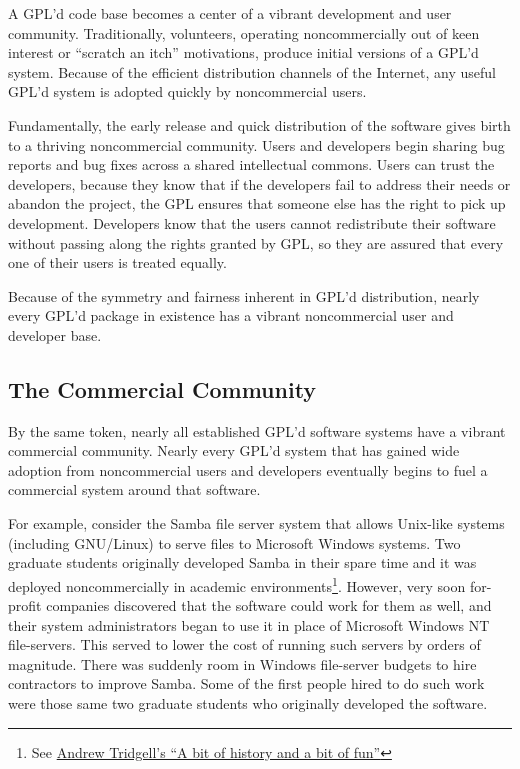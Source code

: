 A GPL'd code base becomes a center of a vibrant development and user
community.  Traditionally, volunteers, operating noncommercially out of
keen interest or ``scratch an itch'' motivations, produce initial versions
of a GPL'd system.  Because of the efficient distribution channels of the
Internet, any useful GPL'd system is adopted quickly by noncommercial
users.

Fundamentally, the early release and quick distribution of the software
gives birth to a thriving noncommercial community.  Users and developers
begin sharing bug reports and bug fixes across a shared intellectual
commons.  Users can trust the developers, because they know that if the
developers fail to address their needs or abandon the project, the GPL
ensures that someone else has the right to pick up development.
Developers know that the users cannot redistribute their software without
passing along the rights granted by GPL, so they are assured that every
one of their users is treated equally.

Because of the symmetry and fairness inherent in GPL'd distribution,
nearly every GPL'd package in existence has a vibrant noncommercial user
and developer base.

\subsection{The Commercial Community}

By the same token, nearly all established GPL'd software systems have a
vibrant commercial community.  Nearly every GPL'd system that has gained
wide adoption from noncommercial users and developers eventually begins
to fuel a commercial system around that software.

For example, consider the Samba file server system that allows Unix-like
systems (including GNU/Linux) to serve files to Microsoft Windows systems.
Two graduate students originally developed Samba in their spare time and
it was deployed noncommercially in academic environments\footnote{See
  \href{http://turtle.ee.ncku.edu.tw/docs/samba/history}{Andrew Tridgell's
    ``A bit of history and a bit of fun''}}.  However, very
soon for-profit companies discovered that the software could work for them
as well, and their system administrators began to use it in place of
Microsoft Windows NT file-servers.  This served to lower the cost of
running such servers by orders of magnitude. There was suddenly room in
Windows file-server budgets to hire contractors to improve Samba.  Some of
the first people hired to do such work were those same two graduate
students who originally developed the software.

